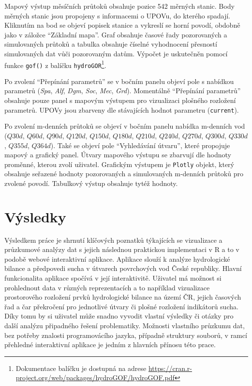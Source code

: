 \documentclass[12pt,]{article}
\let\rmarkdownfootnote\footnote%
\def\footnote{\protect\rmarkdownfootnote}
\begin{document}
\vspace*{-0.3cm}

\qquad Mapový výstup měsíčních průtoků obsahuje pozice 542 měrných
stanic. Body měrných stanic jsou propojeny s informacemi o UPOVu, do
kterého spadají. Kliknutím na bod se objeví popisek stanice a vykreslí
se horní povodí, obdobně jako v záložce \enquote{Základní mapa}. Graf
obsahuje časové řady pozorovaných a simulovaných průtoků a tabulka
obsahuje číselné vyhodnocení přesností simulovaných dat vůči pozorovaným
datům. Výpočet je uskutečněn pomocí funkce \texttt{gof()} z balíčku
\texttt{hydroGOR}\footnote{Dokumentace balíčku je dostupná na adrese
  \url{https://cran.r-project.org/web/packages/hydroGOF/hydroGOF.pdf}}.

\qquad Po zvolení \enquote{Přepínání parametrů} se v bočním panelu
objeví pole s nabídkou parametrů (\emph{Spa}, \emph{Alf}, \emph{Dgm},
\emph{Soc}, \emph{Mec}, \emph{Grd}). Momentálně \enquote{Přepínání
parametrů} obsahuje pouze panel s mapovým výstupem pro vizualizaci
plošného rozložení parametrů. UPOVy jsou zbarveny dle stávajících hodnot
parametru (\texttt{current}).

\qquad Po zvolení m-denních průtoků se objeví v bočním panelu nabídka
m-denních vod (\(Q30d\), \(Q60d\), \(Q90d\), \(Q120d\), \(Q150d\),
\(Q180d\), \(Q210d\), \(Q240d\), \(Q270d\), \(Q300d\), \(Q330d\),
\(Q355d\), \(Q364d\)). Také se objeví pole \enquote{Vyhledávání útvaru},
které propojuje mapový a grafický panel. Útvary mapového výstupu se
zbarvují dle hodnoty proměnné, kterou zvolí uživatel. Grafickým výstupem
je \texttt{Plotly} objekt, který obsahuje seřazené hodnoty pozorovaných
a simulovaných m-denních průtoků pro zvolené povodí. Tabulkový výstup
obsahuje tytéž hodnoty.

\newpage

\section*{Výsledky}\label{vysledky}

\qquad Výsledkem práce je shrnutí klíčových poznatků týkajících se
vizualizace a průzkumové analýzy dat s jejich následnou praktickou
implementaci v R a to v podobě webové interaktivní aplikace. Aplikace
slouží k analýze hydrologické bilance a předpovedi sucha v útvarech
povrchových vod České republiky. Hlavní funkcionalita aplikace spočívá v
její interaktivitě. Uživatel má možnost si prohlednout data v různých
reprezentacích a to například vizualizace prostorového rozložení prvků
hydrologické bilance na území ČR, jejich časových řad a čar překročení
pro jednotlivé útvary či plošné rozložení indikátorů sucha. Díky tomu by
si uživatel může snadno vyvodit vlastní výsledky či otázky pro další
analýzu připadného řešení problematiky. Možnosti vlastního průzkumu dat,
bez potřeby znalosti programovácího jazyka, případně struktury souborů,
v ramcí přehledné interaktivní aplikace je jedním z hlavních přínosu
této prace.
\end{document}
